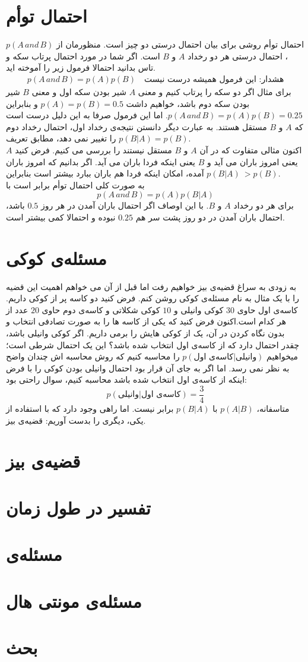 \section{احتمال توأم}
احتمال توأم  روشی برای بیان احتمال درستی دو چیز است. منظورمان از $p(A \,and\, B)$، احتمال درستی هر دو رخداد $A$ و $B$ است. اگر شما در مورد احتمال پرتاب سکه و تاس بدانید احتمالا فرمول زیر را آموخته اید.
\begin{align*}
 p(A \,and\, B) = p(A)p(B) \quad \text{هشدار: این فرمول همیشه درست نیست}
\end{align*}
برای مثال اگر دو سکه را پرتاب کنیم و معنی $A$ شیر بودن سکه اول و معنی $B$ شیر بودن سکه دوم باشد، خواهیم داشت $p(A) = p(B) = 0.5$ و بنابراین $p(A \,and\, B) = p(A)p(B) = 0.25$. اما این فرمول صرفا به این دلیل درست است که $A$ و $B$ مستقل هستند. به عبارت دیگر دانستن نتیجه‌ی رخداد اول، احتمال رخداد دوم را تغییر نمی دهد، مطابق تعریف $p(B|A) = p(B)$.\\
اکنون مثالی متفاوت که در  آن $A$ و $B$ مستقل نیستند را بررسی می کنیم. فرض کنید $A$ یعنی امروز باران می آید و $B$ یعنی اینکه فردا باران می آید. اگر بدانیم که امروز باران آمده، امکان اینکه فردا هم باران ببارد بیشتر است بنابراین $p(B|A) \ > p(B)$.\\
به صورت کلی احتمال توأم برابر است با
$$ p(A \,and\, B) = p(A)p(B|A) $$
برای هر دو رخداد $A$ و $B$. با این اوصاف اگر احتمال باران آمدن در هر روز $0.5$ باشد، احتمال باران آمدن در دو روز پشت سر هم $0.25$ نبوده و احتمالا کمی بیشتر است.
\section{مسئله‌ی کوکی}
به زودی به سراغ قضیه‌ی بیز خواهیم رفت اما قبل از آن می خواهم اهمیت این قضیه را با یک مثال به نام مسئله‌ی کوکی روشن کنم. فرض کنید دو کاسه پر از کوکی داریم. کاسه‌ی اول حاوی $30$ کوکی وانیلی و $10$ کوکی شکلاتی و کاسه‌ی دوم حاوی $20$ عدد از هر کدام است.اکنون فرض کنید که یکی از کاسه ها را به صورت تصادفی انتخاب و بدون نگاه کردن در آن، یک از کوکی هایش را برمی داریم. اگر کوکی وانیلی باشد، چقدر احتمال دارد که از کاسه‌ی اول انتخاب شده باشد؟ این یک احتمال شرطی است؛ میخواهیم \(  p(\text{کاسه‌ی اول}|\text{وانیلی}) \) را محاسبه کنیم که روش محاسبه اش چندان واضح به نظر نمی رسد. اما اگر به جای آن قرار بود احتمال وانیلی بودن کوکی را با فرض اینکه از کاسه‌ی اول انتخاب شده باشد محاسبه کنیم، سوال راحتی بود:
\[  p(\text{وانیلی}|\text{کاسه‌ی اول}) = \frac{3}{4} \]
متاسفانه، $p(A|B)$ با $p(B|A)$ برابر نیست. اما راهی وجود دارد که با استفاده از یکی، دیگری را بدست آوریم: قضیه‌ی بیز.
\section{قضیه‌ی بیز}
\section{تفسیر در طول زمان}
\section{مسئله‌ی }
\section{مسئله‌ی مونتی هال}
\section{بحث}

